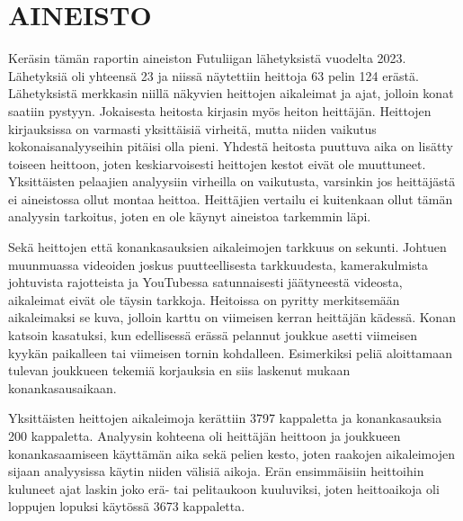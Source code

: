 \section{AINEISTO}\label{sec:data}
    Keräsin tämän raportin aineiston Futuliigan lähetyksistä vuodelta 2023.
    Lähetyksiä oli yhteensä 23 ja niissä näytettiin heittoja 63 pelin 124 erästä.
    Lähetyksistä merkkasin niillä näkyvien heittojen aikaleimat ja ajat, jolloin konat saatiin pystyyn.
    Jokaisesta heitosta kirjasin myös heiton heittäjän.
    Heittojen kirjauksissa on varmasti yksittäisiä virheitä,
    mutta niiden vaikutus kokonaisanalyyseihin pitäisi olla pieni.
    Yhdestä heitosta puuttuva aika on lisätty toiseen heittoon,
    joten keskiarvoisesti heittojen kestot eivät ole muuttuneet.
    Yksittäisten pelaajien analyysiin virheilla on vaikutusta,
    varsinkin jos heittäjästä ei aineistossa ollut montaa heittoa.
    Heittäjien vertailu ei kuitenkaan ollut tämän analyysin tarkoitus,
    joten en ole käynyt aineistoa tarkemmin läpi.

    Sekä heittojen että konankasauksien aikaleimojen tarkkuus on sekunti.
    Johtuen muunmuassa videoiden joskus puutteellisesta tarkkuudesta,
    kamerakulmista johtuvista rajotteista
    ja YouTubessa satunnaisesti jäätyneestä videosta,
    aikaleimat eivät ole täysin tarkkoja.
    Heitoissa on pyritty merkitsemään aikaleimaksi se kuva, jolloin karttu on viimeisen kerran heittäjän kädessä.
    Konan katsoin kasatuksi, kun edellisessä erässä pelannut joukkue asetti viimeisen kyykän paikalleen tai viimeisen tornin kohdalleen.
    E\-si\-mer\-kik\-si peliä aloittamaan tulevan joukkueen tekemiä korjauksia en siis laskenut mukaan konankasausaikaan.

    Yksittäisten heittojen aikaleimoja kerättiin 3797 kappaletta ja konankasauksia 200 kappaletta.
    Analyysin kohteena oli heittäjän heittoon ja joukkueen konankasaamiseen käyttämän aika sekä pelien kesto,
    joten raakojen aikaleimojen sijaan analyysissa käytin niiden välisiä aikoja.
    Erän ensimmäisiin heittoihin kuluneet ajat laskin joko erä- tai pelitaukoon kuuluviksi,
    joten heittoaikoja oli loppujen lopuksi käytössä 3673 kappaletta.

